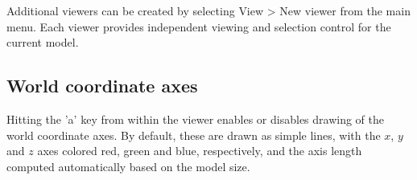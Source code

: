 \documentclass{article}
\begin{document}
Additional viewers can be created by selecting {\sf View > New viewer}
from the main menu. Each viewer provides independent viewing and
selection control for the current model.


\subsection{World coordinate axes}
\label{worldCoordAxes:sec}

Hitting the 'a' key from within the viewer enables or
disables drawing of the world coordinate axes. By default, these are
drawn as simple lines, with the $x$, $y$ and $z$ axes colored red,
green and blue, respectively, and the axis length computed
automatically based on the model size.
\end{document}
